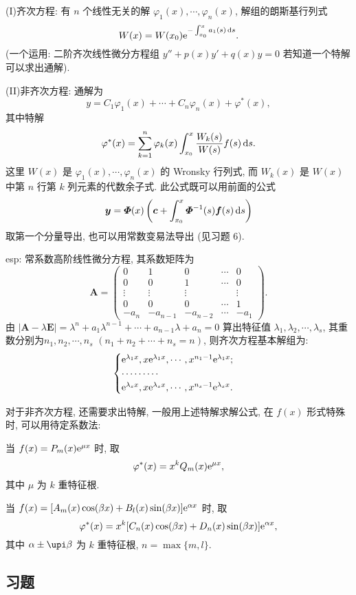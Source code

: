 (I)齐次方程: 有 $n$ 个线性无关的解 $\varphi_1(x),\cdots,\varphi_n(x)$, 解组的朗斯基行列式
\[W(x)=W(x_0)\mathrm{e}^{-\int_{x_0}^xa_1(s)\mathop{}\!\mathrm{d} s}.\]
(一个运用: 二阶齐次线性微分方程组 $y''+p(x)y'+q(x)y=0$ 若知道一个特解可以求出通解).

(II)非齐次方程: 通解为
\[y=C_1\varphi_1(x)+\cdots+C_n\varphi_n(x)+\varphi^*(x),\] 
其中特解
\[\varphi^*(x)=\sum_{k=1}^n\varphi_k(x)\int_{x_0}^x\frac{W_k(s)}{W(s)}f(s)\mathop{}\!\mathrm{d} s.\] 
这里 $W(x)$ 是 $\varphi_1(x),\cdots,\varphi_n(x)$
的 Wronsky 行列式, 而 $W_k(x)$ 是 $W(x)$ 中第 $n$ 行第 $k$ 列元素的代数余子式.
此公式既可以用前面的公式 
\[\bm{y}=\bm{\varPhi}(x)\left(\bm{c}+\int_{x_0}^x\bm{\varPhi}^{-1}(s)\bm{f}(s)\mathop{}\!\mathrm{d} s\right)\]
取第一个分量导出, 也可以用常数变易法导出 (见习题 6).

esp: 常系数高阶线性微分方程, 其系数矩阵为
\[\bm{A} = 
  \begin{pmatrix}
    0 & 1 & 0 & \cdots & 0 \\
    0 & 0 & 1 & \cdots & 0 \\
    \vdots&\vdots&\vdots&&\vdots \\
    0 & 0 & 0 & \cdots & 1 \\
    -a_n&-a_{n-1}&-a_{n-2}&\cdots&-a_1
  \end{pmatrix}.\]
由 $|\bm{A}-\lambda\bm{E}|=\lambda^n+a_1\lambda^{n-1}+\cdots+a_{n-1}\lambda+a_n=0$
算出特征值 $\lambda_1,\lambda_2,\cdots,\lambda_s$, 其重数分别为$n_1,n_2,\cdots,n_s$
$(n_1+n_2+\cdots+n_s=n)$, 则齐次方程基本解组为:
\[\begin{cases}
\mathrm{e}^{\lambda_1x},x\mathrm{e}^{\lambda_1x},\cdots,x^{n_1-1}\mathrm{e}^{\lambda_1x};\\
\cdots\cdots\cdots\\
\mathrm{e}^{\lambda_sx},x\mathrm{e}^{\lambda_sx},\cdots,x^{n_s-1}\mathrm{e}^{\lambda_sx}.
\end{cases}\]

对于非齐次方程, 还需要求出特解, 一般用上述特解求解公式, 在 $f(x)$ 形式特殊时, 可以用待定系数法:

当 $f(x)=P_m(x)\mathrm{e}^{\mu x}$ 时, 取
\[\varphi^*(x)=x^kQ_m(x)\mathrm{e}^{\mu x},\]
其中 $\mu$ 为 $k$ 重特征根.

当 $f(x)=[A_m(x)\cos(\beta x)+B_l(x)\sin(\beta x)]\mathrm{e}^{\alpha x}$ 时, 取
\[\varphi^*(x)=x^k[C_n(x)\cos(\beta x)+D_n(x)\sin(\beta x)]\mathrm{e}^{\alpha x},\]
其中 $\alpha\pm\upi\beta$ 为 $k$ 重特征根, $n=\max\{m,l\}$.



\subsection{习题}



